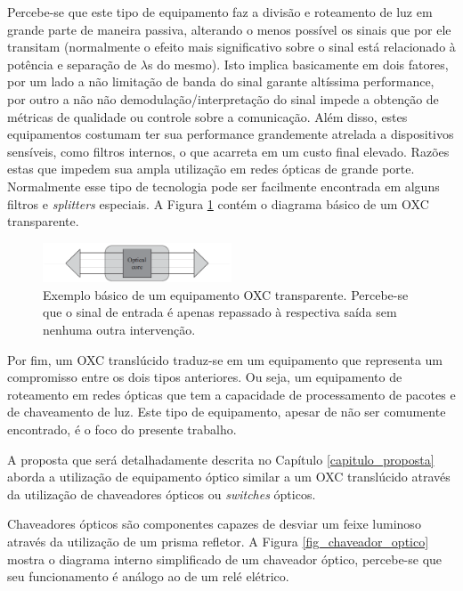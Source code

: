 Percebe-se que este tipo de equipamento faz a divisão e roteamento de luz em grande parte de maneira passiva, alterando o menos possível os sinais que por ele transitam (normalmente o efeito mais significativo sobre o sinal está relacionado à potência e separação de $\lambda$s do mesmo). Isto implica basicamente em dois fatores, por um lado a não limitação de banda do sinal garante altíssima performance, por outro a não não demodulação/interpretação do sinal impede a obtenção de métricas de qualidade ou controle sobre a comunicação. Além disso, estes equipamentos costumam ter sua performance grandemente atrelada a dispositivos sensíveis, como filtros internos, o que acarreta em um custo final elevado. Razões estas que impedem sua ampla utilização em redes ópticas de grande porte. Normalmente esse tipo de tecnologia pode ser facilmente encontrada em alguns filtros e \emph{splitters} especiais. A Figura \ref{fig_oxc_optico} contém o diagrama básico de um OXC transparente. 

\begin{figure}[!htb]
	\centering
	\includegraphics[width=0.5\textwidth]{./figuras/OXC-Optico.png} %
	\caption[Exemplo básico de OXC óptico]{Exemplo básico de um equipamento OXC transparente. Percebe-se que o sinal de entrada é apenas repassado à respectiva saída sem nenhuma outra intervenção.}
	\label{fig_oxc_optico}
\end{figure}

Por fim, um OXC translúcido traduz-se em um equipamento que representa um compromisso entre os dois tipos anteriores. Ou seja, um equipamento de roteamento em redes ópticas que tem a capacidade de processamento de pacotes e de chaveamento de luz. Este tipo de equipamento, apesar de não ser comumente encontrado, é o foco do presente trabalho.

A proposta que será detalhadamente descrita no Capítulo \ref{capitulo_proposta} aborda a utilização de equipamento óptico similar a um OXC translúcido através da utilização de chaveadores ópticos ou \emph{switches} ópticos.

Chaveadores ópticos são componentes capazes de desviar um feixe luminoso através da utilização de um prisma refletor. A Figura \ref{fig_chaveador_optico} mostra o diagrama interno simplificado de um chaveador óptico, percebe-se que seu funcionamento é análogo ao de um relé elétrico.

